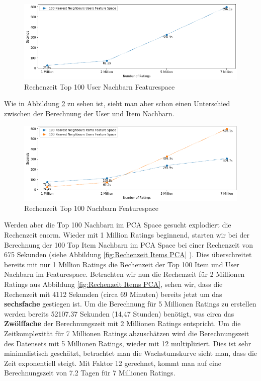 \begin{figure}[h!tb]
	\centering
	\includegraphics[keepaspectratio,width=\linewidth]{img/Time to Compute User Featurespace.png} 
	\caption{Rechenzeit Top 100 User Nachbarn Featurespace}
	\label{fig:Rechenzeit Usernachbarn Featurespace}
\end{figure}
Wie in Abbildung \ref{fig:Rechenzeit Featurespace} zu sehen ist, sieht man aber schon einen Unterschied zwischen der Berechnung der User und Item Nachbarn.
\begin{figure}[h!tb]
	\centering
	\includegraphics[keepaspectratio,width=\linewidth]{img/Time to Compute Featurespace.png} 
	\caption{Rechenzeit Top 100 Nachbarn Featurespace}
	\label{fig:Rechenzeit Featurespace}
\end{figure}

Werden aber die Top 100 Nachbarn im PCA Space gesucht explodiert die Rechenzeit enorm. Wieder mit 1 Million Ratings beginnend, starten wir bei der Berechnung der 100 Top Item Nachbarn im PCA Space bei einer Rechenzeit von 675 Sekunden (siehe Abbildung \ref{fig:Rechenzeit Items PCA} ). Dies überschreitet bereits mit nur 1 Million Ratings die Rechenzeit der Top 100 Item und User Nachbarn im Featurespace. Betrachten wir nun die Rechenzeit für 2 Millionen Ratings aus Abbildung \ref{fig:Rechenzeit Items PCA}, sehen wir, dass die Rechenzeit mit 4112 Sekunden (circa 69 Minuten) bereits jetzt um das \textbf{sechsfache} gestiegen ist. Um die Berechnung für 5 Millionen Ratings zu erstellen werden bereits 52107.37 Sekunden (14,47 Stunden) benötigt, was circa das \textbf{Zwölffache} der Berechnungszeit mit 2 Millionen Ratings entspricht. Um die Zeitkomplexität für 7 Millionen Ratings abzuschätzen wird die Berechnungszeit des Datensets mit 5 Millionen Ratings, wieder mit 12 multipliziert. Dies ist sehr minimalistisch geschätzt, betrachtet man die Wachstumskurve sieht man, dass die Zeit exponentiell steigt. Mit Faktor 12 gerechnet, kommt man auf eine Berechnungszeit von 7.2 Tagen für 7 Millionen Ratings.


